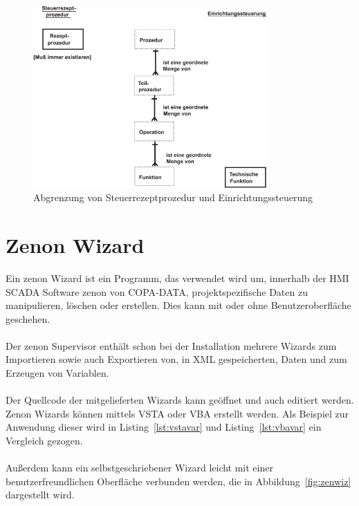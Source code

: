 \begin{figure}[h!]
		\centering
		\includegraphics[width=0.8\textwidth]{graphics/stateoftheart/steuerrezeptprozedur_einrichtungssteuerung.png}
		\caption{Abgrenzung von Steuerrezeptprozedur und Einrichtungssteuerung \cite{en61512}}
\end{figure}


\section{Zenon Wizard}
Ein zenon Wizard ist ein Programm, das verwendet wird um, innerhalb der HMI SCADA Software zenon von COPA-DATA, projektspezifische Daten zu manipulieren, löschen oder erstellen. Dies kann mit oder ohne Benutzeroberfläche geschehen.\\\\
Der zenon Supervisor enthält schon bei der Installation mehrere Wizards zum Importieren sowie auch Exportieren von, in \ac{XML} gespeicherten, Daten und zum Erzeugen von Variablen.\cite{zenprog}\\\\
Der Quellcode der mitgelieferten Wizards kann geöffnet und auch editiert werden.\\
Zenon Wizards können mittels \ac{VSTA} oder \ac{VBA} erstellt werden. Als Beispiel zur Anwendung dieser wird in Listing~\ref{lst:vstavar} und Listing~\ref{lst:vbavar} ein Vergleich gezogen.\\\\
Außerdem kann ein selbstgeschriebener Wizard leicht mit einer benutzerfreundlichen Oberfläche verbunden werden, die in Abbildung~\ref{fig:zenwiz} dargestellt wird.

